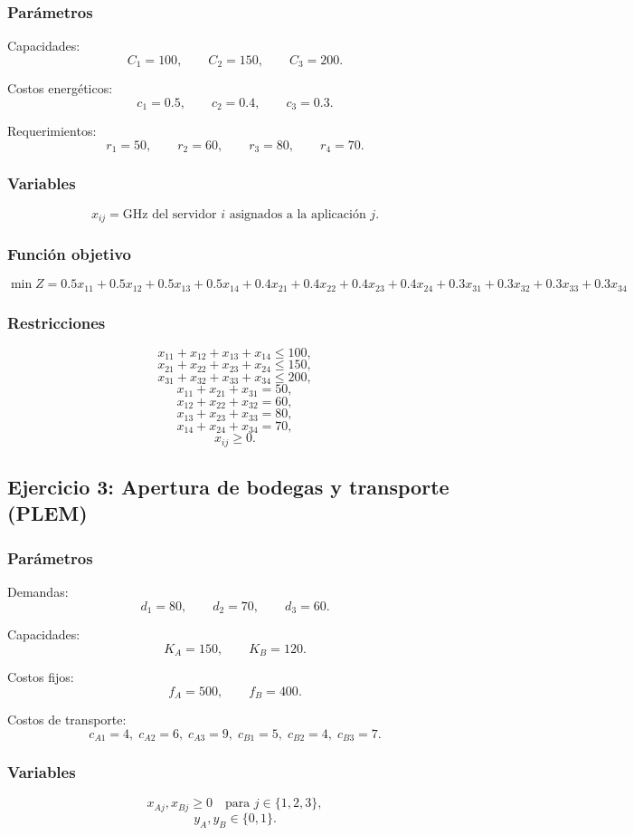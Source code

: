 \documentclass[12pt,a4paper]{article}
\begin{document}
\subsubsection*{Parámetros}
Capacidades:
\[
C_1=100,\qquad C_2=150,\qquad C_3=200.
\]

Costos energéticos:
\[
c_1=0.5,\qquad c_2=0.4,\qquad c_3=0.3.
\]

Requerimientos:
\[
r_1=50,\qquad r_2=60,\qquad r_3=80,\qquad r_4=70.
\]

\subsubsection*{Variables}
\[
x_{ij}=\text{GHz del servidor } i \text{ asignados a la aplicación } j.
\]

\subsubsection*{Función objetivo}
\[
\min Z = 0.5x_{11}+0.5x_{12}+0.5x_{13}+0.5x_{14}
+0.4x_{21}+0.4x_{22}+0.4x_{23}+0.4x_{24}
+0.3x_{31}+0.3x_{32}+0.3x_{33}+0.3x_{34}
\]

\subsubsection*{Restricciones}
\[
x_{11}+x_{12}+x_{13}+x_{14}\le 100,
\]
\[
x_{21}+x_{22}+x_{23}+x_{24}\le 150,
\]
\[
x_{31}+x_{32}+x_{33}+x_{34}\le 200,
\]
\[
x_{11}+x_{21}+x_{31}=50,
\]
\[
x_{12}+x_{22}+x_{32}=60,
\]
\[
x_{13}+x_{23}+x_{33}=80,
\]
\[
x_{14}+x_{24}+x_{34}=70,
\]
\[
x_{ij}\ge 0.
\]

\subsection{Ejercicio 3: Apertura de bodegas y transporte (PLEM)}

\subsubsection*{Parámetros}
Demandas:
\[
d_1=80,\qquad d_2=70,\qquad d_3=60.
\]

Capacidades:
\[
K_A=150,\qquad K_B=120.
\]

Costos fijos:
\[
f_A=500,\qquad f_B=400.
\]

Costos de transporte:
\[
c_{A1}=4,\; c_{A2}=6,\; c_{A3}=9,\; c_{B1}=5,\; c_{B2}=4,\; c_{B3}=7.
\]

\subsubsection*{Variables}
\[
x_{Aj},x_{Bj}\ge 0 \quad \text{para } j\in\{1,2,3\},
\]
\[
y_A,y_B\in\{0,1\}.
\]
\end{document}
